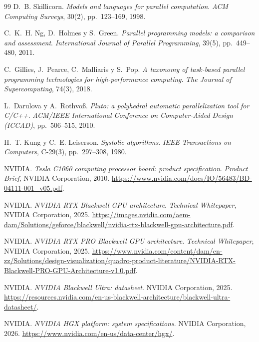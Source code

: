 \documentclass[a4paper,11pt]{article}
\begin{document}
\begin{thebibliography}{99}
D.~B. Skillicorn.
\newblock \emph{Models and languages for parallel computation}.
\newblock \emph{ACM Computing Surveys}, 30(2), pp.~123--169, 1998.

C.~K.~H. Ng, D.~Holmes y S.~Green.
\newblock \emph{Parallel programming models: a comparison and assessment}.
\newblock \emph{International Journal of Parallel Programming}, 39(5), pp.~449--480, 2011.

C.~Gillies, J.~Pearce, C.~Malliaris y S.~Pop.
\newblock \emph{A taxonomy of task-based parallel programming technologies for high-performance computing}.
\newblock \emph{The Journal of Supercomputing}, 74(3), 2018.

L.~Darulova y A.~Rothvoß.
\newblock \emph{Pluto: a polyhedral automatic parallelization tool for C/C++}.
\newblock \emph{ACM/IEEE International Conference on Computer-Aided Design (ICCAD)}, pp.~506--515, 2010.

H.~T. Kung y C.~E. Leiserson.
\newblock \emph{Systolic algorithms}.
\newblock \emph{IEEE Transactions on Computers}, C-29(3), pp.~297--308, 1980.

NVIDIA.
\newblock \emph{Tesla C1060 computing processor board: product specification}.
\newblock \emph{Product Brief}, NVIDIA Corporation, 2010.
\newblock \url{https://www.nvidia.com/docs/IO/56483/BD-04111-001_v05.pdf}.

NVIDIA.
\newblock \emph{NVIDIA RTX Blackwell GPU architecture}.
\newblock \emph{Technical Whitepaper}, NVIDIA Corporation, 2025.
\newblock \url{https://images.nvidia.com/aem-dam/Solutions/geforce/blackwell/nvidia-rtx-blackwell-gpu-architecture.pdf}.

NVIDIA.
\newblock \emph{NVIDIA RTX PRO Blackwell GPU architecture}.
\newblock \emph{Technical Whitepaper}, NVIDIA Corporation, 2025.
\newblock \url{https://www.nvidia.com/content/dam/en-zz/Solutions/design-visualization/quadro-product-literature/NVIDIA-RTX-Blackwell-PRO-GPU-Architecture-v1.0.pdf}.

NVIDIA.
\newblock \emph{NVIDIA Blackwell Ultra: datasheet}.
\newblock NVIDIA Corporation, 2025.
\newblock \url{https://resources.nvidia.com/en-us-blackwell-architecture/blackwell-ultra-datasheet/}.

NVIDIA.
\newblock \emph{NVIDIA HGX platform: system specifications}.
\newblock NVIDIA Corporation, 2026.
\newblock \url{https://www.nvidia.com/en-us/data-center/hgx/}.


\end{thebibliography}
\end{document}
